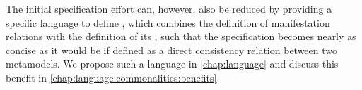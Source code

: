 The initial specification effort can, however, also be reduced by providing a specific language to define \commonalities, which combines the definition of manifestation relations with the definition of its \commonality, such that the specification becomes nearly as concise as it would be if defined as a direct consistency relation between two metamodels.
We propose such a language in \autoref{chap:language} and discuss this benefit in \autoref{chap:language:commonalities:benefits}.





